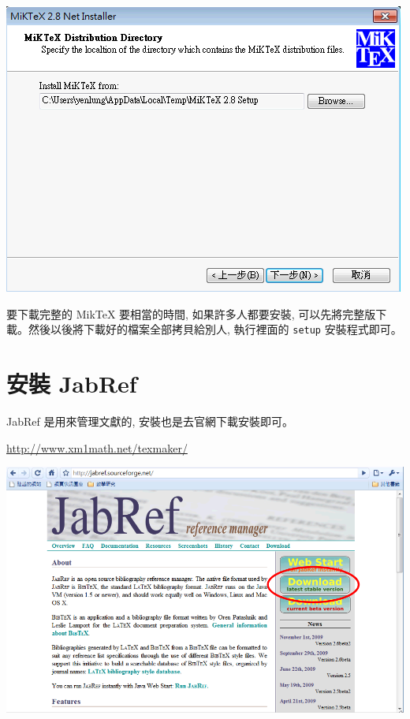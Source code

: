 \documentclass[12pt]{report}
\newcommand{\cmd}{\texttt}
\begin{document}
\begin{center}
\includegraphics[scale=0.5]{miktex_install.png}
\end{center}

要下載完整的 MikTeX 要相當的時間, 如果許多人都要安裝, 可以先將完整版下載。然後以後將下載好的檔案全部拷貝給別人, 執行裡面的 \cmd{setup} 安裝程式即可。

%
\section{安裝 JabRef}
JabRef 是用來管理文獻的, 安裝也是去官網下載安裝即可。

\url{http://www.xm1math.net/texmaker/}

\begin{center}
\includegraphics[scale=0.4]{windows_jabref.png}
\end{center}
\end{document}
